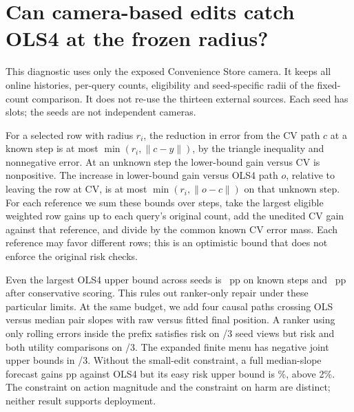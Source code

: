 \section{Can camera-based edits catch OLS4 at the frozen radius?}
This diagnostic uses only the exposed Convenience Store camera.
It keeps all \WepCapHistories{} online histories, per-query counts,
eligibility and seed-specific radii of the fixed-count comparison.
It does not re-use the thirteen external sources. Each seed has
\WepCapEdits{} slots; the seeds are not independent cameras.

For a selected row with radius $r_i$, the reduction in error from
the CV path $c$ at a known step is at most
$\min(r_i,\|c-y\|)$, by the triangle inequality and nonnegative
error. At an unknown step the lower-bound gain versus CV is
nonpositive. The increase in lower-bound gain versus OLS4 path $o$,
relative to leaving the row at CV, is at most
$\min(r_i,\|o-c\|)$ on that unknown step. For each reference we
sum these bounds over steps, take the largest eligible weighted
row gains up to each query's original count, add the unedited CV
gain against that reference, and divide by the common known CV
error mass. Each reference may favor different rows; this is an
optimistic bound that does not enforce the original risk checks.

Even the largest OLS4 upper bound across seeds is
\mbox{\WepCapObserved{} pp} on known steps and \mbox{\WepCapConservative{} pp}
after conservative scoring. This rules out ranker-only repair
under these particular limits. At the same budget, we add four
causal paths crossing OLS versus median pair slopes with raw
versus fitted final position. A ranker using only rolling errors
inside the prefix satisfies risk on \WepCapPrefixPass{}/3
seed views but risk and both utility comparisons on
\WepCapPrefixDual{}/3. The expanded finite menu has negative
joint upper bounds in \WepCapExpandedExclusion{}/3.
Without the small-edit constraint, a full median-slope
forecast gains \WepCapMedianVsOLS{} pp against OLS4 but its
easy risk upper bound is \WepCapMedianEasy\%, above 2\%.
The constraint on action magnitude and the constraint on harm
are distinct; neither result supports deployment.
